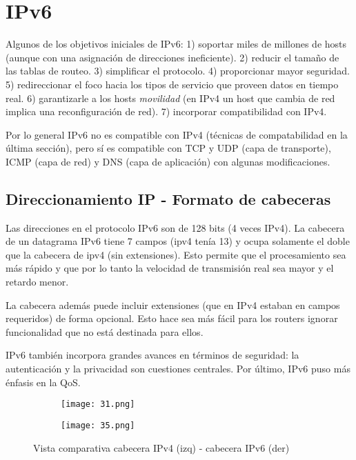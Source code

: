 \documentclass{book}
\begin{document}
	\pagebreak
	\section{IPv6}
	Algunos de los objetivos iniciales de IPv6: 1) soportar miles de millones de hosts (aunque con una asignación de direcciones ineficiente). 2) reducir el tamaño de las tablas de routeo. 3) simplificar el protocolo. 4) proporcionar mayor seguridad. 5) redireccionar el foco hacia los tipos de servicio que proveen datos en tiempo real. 6) garantizarle a los hosts \textit{movilidad} (en IPv4 un host que cambia de red implica una reconfiguración de red). 7) incorporar compatibilidad con IPv4.
	
	\vspace{3mm}
	Por lo general IPv6 no es compatible con IPv4 (técnicas de compatabilidad en la última sección), pero sí es compatible con TCP y UDP (capa de transporte), ICMP (capa de red) y DNS (capa de aplicación) con algunas modificaciones.
	
	\subsection{Direccionamiento IP - Formato de cabeceras}
	Las direcciones en el protocolo IPv6 son de 128 bits (4 veces IPv4). La cabecera de un datagrama IPv6 tiene 7 campos (ipv4 tenía 13) y ocupa solamente el doble que la cabecera de ipv4 (sin extensiones). Esto permite que el procesamiento sea más rápido y que por lo tanto la velocidad de transmisión real sea mayor y el retardo menor.
	
	\vspace{3mm}
	La cabecera además puede incluir extensiones (que en IPv4 estaban en campos requeridos) de forma opcional. Esto hace sea más fácil para los routers ignorar funcionalidad que no está destinada para ellos.
	
	\vspace{3mm}
	IPv6 también incorpora grandes avances en términos de seguridad: la autenticación y la privacidad son cuestiones centrales. Por último, IPv6 puso más énfasis en la QoS.
	
	\begin{figure}[H]
		\centering
		\begin{subfigure}{0.4\textwidth}
			\centering
			\texttt{[image: 31.png]}
		\end{subfigure}
		\qquad
		\begin{subfigure}{0.4\textwidth}
			\centering
			\texttt{[image: 35.png]}
		\end{subfigure}
		\caption{Vista comparativa cabecera IPv4 (izq) - cabecera IPv6 (der)}
	\end{figure}
	
\end{document}
